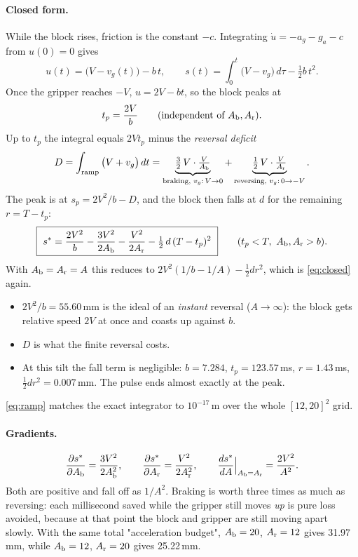 \documentclass[11pt,a4paper]{article}
\begin{document}
\paragraph{Closed form.} While the block rises, friction is the constant $-c$. Integrating
$\dot u=-a_g-g_a-c$ from $u(0)=0$ gives
\[
  u(t)=\big(V-v_g(t)\big)-b\,t,\qquad s(t)=\int_0^t\big(V-v_g\big)\,d\tau-\tfrac12 b\,t^2 .
\]
Once the gripper reaches $-V$, $u=2V-bt$, so the block peaks at
\[
  t_p=\frac{2V}{b}\qquad\text{(independent of }A_{\rm b},A_{\rm r}).
\]
Up to $t_p$ the integral equals $2Vt_p$ minus the \emph{reversal deficit}
\[
  D=\int_{\text{ramp}}\big(V+v_g\big)\,dt=\underbrace{\tfrac32\,V\cdot\tfrac{V}{A_{\rm b}}}_{\text{braking, }v_g:\,V\to0}
   +\underbrace{\tfrac12\,V\cdot\tfrac{V}{A_{\rm r}}}_{\text{reversing, }v_g:\,0\to-V}.
\]
The peak is at $s_p=2V^2/b-D$, and the block then falls at $d$ for the remaining $r=T-t_p$:
\begin{equation}
  \boxed{\ s^*=\frac{2V^2}{b}-\frac{3V^2}{2A_{\rm b}}-\frac{V^2}{2A_{\rm r}}-\tfrac12\,d\,(T-t_p)^2\ }
  \qquad(t_p<T,\ A_{\rm b},A_{\rm r}>b).
  \label{eq:ramp}
\end{equation}
With $A_{\rm b}=A_{\rm r}=A$ this reduces to $2V^2(1/b-1/A)-\tfrac12dr^2$, which is \eqref{eq:closed} again.
\begin{itemize}
  \item $2V^2/b=55.60$\,mm is the ideal of an \emph{instant} reversal ($A\to\infty$): the block gets relative speed
        $2V$ at once and coasts up against $b$.
  \item $D$ is what the finite reversal costs.
  \item At this tilt the fall term is negligible: $b=7.284$, $t_p=123.57$\,ms, $r=1.43$\,ms, $\tfrac12dr^2=0.007$\,mm.
        The pulse ends almost exactly at the peak.
\end{itemize}
\eqref{eq:ramp} matches the exact integrator to $10^{-17}$\,m over the whole $[12,20]^2$ grid.

\paragraph{Gradients.}
\[
  \frac{\partial s^*}{\partial A_{\rm b}}=\frac{3V^2}{2A_{\rm b}^2},\qquad
  \frac{\partial s^*}{\partial A_{\rm r}}=\frac{V^2}{2A_{\rm r}^2},\qquad
  \frac{d s^*}{dA}\Big|_{A_{\rm b}=A_{\rm r}}=\frac{2V^2}{A^2}.
\]
Both are positive and fall off as $1/A^2$. Braking is worth three times as much as reversing: each millisecond saved
while the gripper still moves \emph{up} is pure loss avoided, because at that point the block and gripper are still
moving apart slowly. With the same total "acceleration budget", $A_{\rm b}=20$, $A_{\rm r}=12$ gives 31.97\,mm,
while $A_{\rm b}=12$, $A_{\rm r}=20$ gives 25.22\,mm.
\end{document}
